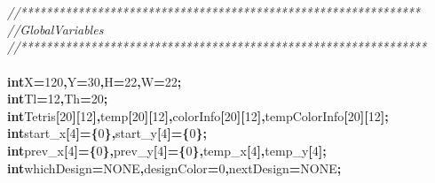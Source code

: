 \documentclass[a4paper, 10pt]{article}
\newcommand\SPC{\hspace*{0.6em}}
\newcommand{\CppAComment}[1]{\textit{\textcolor[rgb]{0.2,0.6,1}{#1}}}
\newcommand{\CppAIdentifier}[1]{#1}
\newcommand{\CppANumber}[1]{\textcolor[rgb]{0.5,0,0.5}{#1}}
\newcommand{\CppAReservedWord}[1]{\textbf{#1}}
\newcommand{\CppASpace}[1]{\colorbox[rgb]{1,1,1}{#1}}
\newcommand{\CppASymbol}[1]{\textbf{\textcolor[rgb]{1,0,0}{#1}}}
\begin{document}
\begin{ttfamily}
\\
\\
\CppAComment{//***************************************************************}\\
\CppAComment{//\SPC \SPC \SPC \SPC \SPC \SPC \SPC \SPC \SPC \SPC \SPC \SPC \SPC \SPC \SPC \SPC \SPC \SPC \SPC Global\SPC Variables}\\
\CppAComment{//****************************************************************}\\
\\
\CppAReservedWord{int}\CppASpace{\SPC }\CppAIdentifier{X}\CppASymbol{=}\CppANumber{120}\CppASymbol{,}\CppAIdentifier{Y}\CppASymbol{=}\CppANumber{30}\CppASymbol{,}\CppAIdentifier{H}\CppASymbol{=}\CppANumber{22}\CppASymbol{,}\CppAIdentifier{W}\CppASymbol{=}\CppANumber{22}\CppASymbol{;}\\
\CppAReservedWord{int}\CppASpace{\SPC }\CppAIdentifier{Tl}\CppASymbol{=}\CppANumber{12}\CppASymbol{,}\CppAIdentifier{Th}\CppASymbol{=}\CppANumber{20}\CppASymbol{;}\\
\CppAReservedWord{int}\CppASpace{\SPC }\CppAIdentifier{Tetris}\CppASymbol{[}\CppANumber{20}\CppASymbol{]}\CppASymbol{[}\CppANumber{12}\CppASymbol{]}\CppASymbol{,}\CppAIdentifier{temp}\CppASymbol{[}\CppANumber{20}\CppASymbol{]}\CppASymbol{[}\CppANumber{12}\CppASymbol{]}\CppASymbol{,}\CppAIdentifier{colorInfo}\CppASymbol{[}\CppANumber{20}\CppASymbol{]}\CppASymbol{[}\CppANumber{12}\CppASymbol{]}\CppASymbol{,}\CppAIdentifier{tempColorInfo}\CppASymbol{[}\CppANumber{20}\CppASymbol{]}\CppASymbol{[}\CppANumber{12}\CppASymbol{]}\CppASymbol{;}\\
\CppAReservedWord{int}\CppASpace{\SPC }\CppAIdentifier{start\_x}\CppASymbol{[}\CppANumber{4}\CppASymbol{]}\CppASymbol{=}\CppASymbol{\{}\CppANumber{0}\CppASymbol{\}}\CppASymbol{,}\CppASpace{\SPC }\CppAIdentifier{start\_y}\CppASymbol{[}\CppANumber{4}\CppASymbol{]}\CppASymbol{=}\CppASymbol{\{}\CppANumber{0}\CppASymbol{\}}\CppASymbol{;}\\
\CppAReservedWord{int}\CppASpace{\SPC }\CppAIdentifier{prev\_x}\CppASymbol{[}\CppANumber{4}\CppASymbol{]}\CppASymbol{=}\CppASymbol{\{}\CppANumber{0}\CppASymbol{\}}\CppASymbol{,}\CppAIdentifier{prev\_y}\CppASymbol{[}\CppANumber{4}\CppASymbol{]}\CppASymbol{=}\CppASymbol{\{}\CppANumber{0}\CppASymbol{\}}\CppASymbol{,}\CppAIdentifier{temp\_x}\CppASymbol{[}\CppANumber{4}\CppASymbol{]}\CppASymbol{,}\CppAIdentifier{temp\_y}\CppASymbol{[}\CppANumber{4}\CppASymbol{]}\CppASymbol{;}\\
\CppAReservedWord{int}\CppASpace{\SPC }\CppAIdentifier{whichDesign}\CppASymbol{=}\CppAIdentifier{NONE}\CppASymbol{,}\CppASpace{\SPC }\CppAIdentifier{designColor}\CppASymbol{=}\CppANumber{0}\CppASymbol{,}\CppASpace{\SPC }\CppAIdentifier{nextDesign}\CppASymbol{=}\CppAIdentifier{NONE}\CppASymbol{;}\\

\end{ttfamily}
\end{document}
